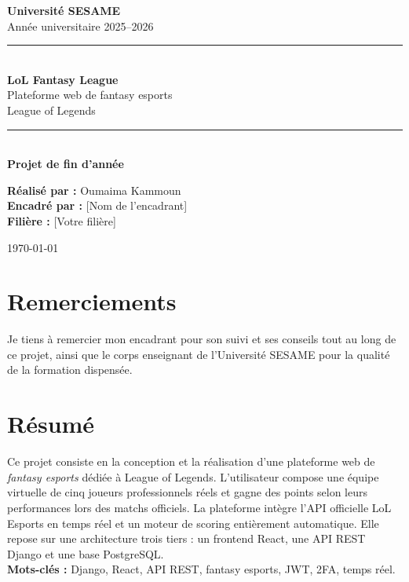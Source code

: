 \documentclass[12pt,a4paper]{report}
\begin{document}
\begin{titlepage}
\centering
\vspace*{1cm}
{\Large\textbf{Université SESAME}}\\[0.3cm]
{\large Année universitaire 2025--2026}\\[2cm]

\rule{\linewidth}{0.5mm}\\[0.5cm]
{\Huge\bfseries LoL Fantasy League}\\[0.4cm]
{\Large Plateforme web de fantasy esports\\League of Legends}\\[0.3cm]
\rule{\linewidth}{0.5mm}\\[2cm]

{\large \textbf{Projet de fin d'année}}\\[2cm]

\begin{flushleft}
\large
\textbf{Réalisé par :} Oumaima Kammoun\\[0.3cm]
\textbf{Encadré par :} [Nom de l'encadrant]\\[0.3cm]
\textbf{Filière :} [Votre filière]\\
\end{flushleft}

\vfill
{\large \today}
\end{titlepage}

\chapter*{Remerciements}
Je tiens à remercier mon encadrant pour son suivi et ses conseils tout au long
de ce projet, ainsi que le corps enseignant de l'Université SESAME pour la
qualité de la formation dispensée.

\chapter*{Résumé}
Ce projet consiste en la conception et la réalisation d'une plateforme web de
\textit{fantasy esports} dédiée à League of Legends. L'utilisateur compose une
équipe virtuelle de cinq joueurs professionnels réels et gagne des points selon
leurs performances lors des matchs officiels. La plateforme intègre l'API
officielle LoL Esports en temps réel et un moteur de scoring entièrement
automatique. Elle repose sur une architecture trois tiers : un frontend React,
une API REST Django et une base PostgreSQL.\\[0.3cm]
\textbf{Mots-clés :} Django, React, API REST, fantasy esports, JWT, 2FA, temps réel.
\end{document}
